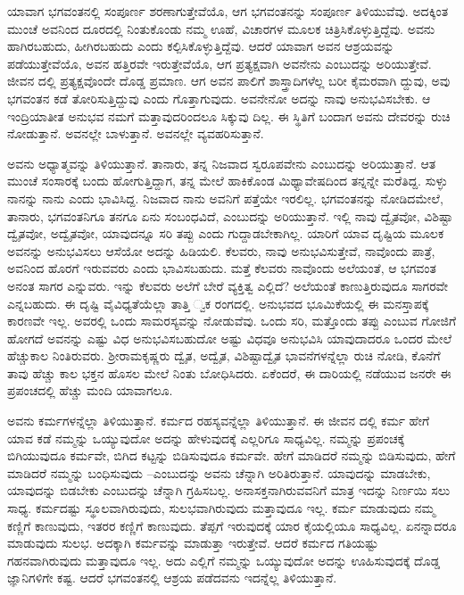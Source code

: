 ಯಾವಾಗ ಭಗವಂತನಲ್ಲಿ ಸಂಪೂರ್ಣ ಶರಣಾಗುತ್ತೇವೆಯೊ, ಆಗ ಭಗವಂತನನ್ನು ಸಂಪೂರ್ಣ ತಿಳಿಯುವೆವು. ಅದಕ್ಕಿಂತ ಮುಂಚೆ ಅವನಿಂದ ದೂರದಲ್ಲಿ ನಿಂತುಕೊಂಡು ನಮ್ಮ ಊಹೆ, ವಿಚಾರಗಳ ಮೂಲಕ ಚಿತ್ರಿಸಿಕೊಳ್ಳುತ್ತಿದ್ದೆವು. ಅವನು ಹಾಗಿರಬಹುದು, ಹೀಗಿರಬಹುದು ಎಂದು ಕಲ್ಪಿಸಿಕೊಳ್ಳುತ್ತಿದ್ದೆವು. ಆದರೆ ಯಾವಾಗ ಅವನ ಆಶ್ರಯವನ್ನು ಪಡೆಯುತ್ತೇವೆಯೊ, ಅವನ ಹತ್ತಿರವೇ ಇರುತ್ತೇವೆಯೊ, ಆಗ ಪ್ರತ್ಯಕ್ಷವಾಗಿ ಅವನೇನು ಎಂಬುದನ್ನು ಅರಿಯುತ್ತೇವೆ. ಜೀವನ ದಲ್ಲಿ ಪ್ರತ್ಯಕ್ಷವೊಂದೇ ದೊಡ್ಡ ಪ್ರಮಾಣ. ಆಗ ಅವನ ಪಾಲಿಗೆ ಶಾಸ್ತ್ರಾದಿಗಳೆಲ್ಲ ಬರೀ ಕೈಮರವಾಗಿ ದ್ದುವು, ಅವು ಭಗವಂತನ ಕಡೆ ತೋರಿಸುತ್ತಿದ್ದುವು ಎಂದು ಗೊತ್ತಾಗುವುದು. ಅವನೇನೋ ಅದನ್ನು ನಾವು ಅನುಭವಿಸಬೇಕು. ಆ ಇಂದ್ರಿಯಾತೀತ ಅನುಭವ ನಮಗೆ ಮತ್ತಾವುದರಿಂದಲೂ ಸಿಕ್ಕುವು ದಿಲ್ಲ. ಈ ಸ್ಥಿತಿಗೆ ಬಂದಾಗ ಅವನು ದೇವರನ್ನು ರುಚಿ ನೋಡುತ್ತಾನೆ. ಅವನಲ್ಲೇ ಬಾಳುತ್ತಾನೆ. ಅವನಲ್ಲೇ ವ್ಯವಹರಿಸುತ್ತಾನೆ.

ಅವನು ಅಧ್ಯಾತ್ಮವನ್ನು ತಿಳಿಯುತ್ತಾನೆ. ತಾನಾರು, ತನ್ನ ನಿಜವಾದ ಸ್ವರೂಪವೇನು ಎಂಬುದನ್ನು ಅರಿಯುತ್ತಾನೆ. ಆತ ಮುಂಚೆ ಸಂಸಾರಕ್ಕೆ ಬಂದು ಹೋಗುತ್ತಿದ್ದಾಗ, ತನ್ನ ಮೇಲೆ ಹಾಕಿಕೊಂಡ ಮಿಥ್ಯಾವೇಷದಿಂದ ತನ್ನನ್ನೇ ಮರೆತಿದ್ದ. ಸುಳ್ಳು ನಾನನ್ನು ನಾನು ಎಂದು ಭಾವಿಸಿದ್ದ. ನಿಜವಾದ ನಾನು ಅವನಿಗೆ ಪತ್ತೆಯೇ ಇರಲಿಲ್ಲ. ಭಗವಂತನನ್ನು ನೋಡಿದಮೇಲೆ, ತಾನಾರು, ಭಗವಂತನಿಗೂ ತನಗೂ ಏನು ಸಂಬಂಧವಿದೆ, ಎಂಬುದನ್ನು ಅರಿಯುತ್ತಾನೆ. ಇಲ್ಲಿ ನಾವು ದ್ವೈತವೋ, ವಿಶಿಷ್ಟಾ ದ್ವೈತವೋ, ಅದ್ವೈತವೋ, ಯಾವುದನ್ನೂ ಸರಿ ತಪ್ಪು ಎಂದು ಗುದ್ದಾಡಬೇಕಾಗಿಲ್ಲ. ಯಾರಿಗೆ ಯಾವ ದೃಷ್ಟಿಯ ಮೂಲಕ ಅವನನ್ನು ಅನುಭವಿಸಲು ಆಸೆಯೋ ಅದನ್ನು ಹಿಡಿಯಲಿ. ಕೆಲವರು, ನಾವು ಅನುಭವಿಸುತ್ತೇವೆ, ನಾವೊಂದು ಪಾತ್ರೆ, ಅವನಿಂದ ಹೊರಗೆ ಇರುವವರು ಎಂದು ಭಾವಿಸಬಹುದು. ಮತ್ತೆ ಕೆಲವರು ನಾವೊಂದು ಅಲೆಯಂತೆ, ಆ ಭಗವಂತ ಅನಂತ ಸಾಗರ ಎನ್ನುವರು. ಇನ್ನು ಕೆಲವರು ಅಲೆಗೆ ಬೇರೆ ವ್ಯಕ್ತಿತ್ವ ಎಲ್ಲಿದೆ? ಅಲೆಯಂತೆ ಕಾಣುತ್ತಿರುವುದೂ ಸಾಗರವೇ ಎನ್ನಬಹುದು. ಈ ದೃಷ್ಟಿ ವೈವಿಧ್ಯತೆಯೆಲ್ಲಾ ತಾತ್ತಿ ್ವಕ ರಂಗದಲ್ಲಿ. ಅನುಭವದ ಭೂಮಿಕೆಯಲ್ಲಿ ಈ ಮನಸ್ತಾಪಕ್ಕೆ ಕಾರಣವೇ ಇಲ್ಲ. ಅವರಲ್ಲಿ ಒಂದು ಸಾಮರಸ್ಯವನ್ನು ನೋಡುವೆವು. ಒಂದು ಸರಿ, ಮತ್ತೊಂದು ತಪ್ಪು ಎಂಬುವ ಗೋಜಿಗೆ ಹೋಗದೆ ಅವನನ್ನು ಎಷ್ಟು ವಿಧ ಅನುಭವಿಸಬಹುದೋ ಅಷ್ಟು ವಿಧವೂ ಅನುಭವಿಸಿ ಯಾವುದಾದರೂ ಒಂದರ ಮೇಲೆ ಹೆಚ್ಚುಕಾಲ ನಿಂತಿರುವರು. ಶ‍್ರೀರಾಮಕೃಷ್ಣರು ದ್ವೈತ, ಅದ್ವೈತ, ವಿಶಿಷ್ಟಾದ್ವೈತ ಭಾವನೆಗಳನ್ನೆಲ್ಲಾ ರುಚಿ ನೋಡಿ, ಕೊನೆಗೆ ತಾವು ಹೆಚ್ಚು ಕಾಲ ಭಕ್ತನ ಹೊಸಲ ಮೇಲೆ ನಿಂತು ಬೋಧಿಸಿದರು. ಏಕೆಂದರೆ, ಈ ದಾರಿಯಲ್ಲಿ ನಡೆಯುವ ಜನರೇ ಈ ಪ್ರಪಂಚದಲ್ಲಿ ಹೆಚ್ಚು ಮಂದಿ ಯಾವಾಗಲೂ.

ಅವನು ಕರ್ಮಗಳನ್ನೆಲ್ಲಾ ತಿಳಿಯುತ್ತಾನೆ. ಕರ್ಮದ ರಹಸ್ಯವನ್ನೆಲ್ಲಾ ತಿಳಿಯುತ್ತಾನೆ. ಈ ಜೀವನ ದಲ್ಲಿ ಕರ್ಮ ಹೇಗೆ ಯಾವ ಕಡೆ ನಮ್ಮನ್ನು ಒಯ್ಯುವುದೋ ಅದನ್ನು ಹೇಳುವುದಕ್ಕೆ ಎಲ್ಲರಿಗೂ ಸಾಧ್ಯವಿಲ್ಲ. ನಮ್ಮನ್ನು ಪ್ರಪಂಚಕ್ಕೆ ಬಿಗಿಯುವುದೂ ಕರ್ಮವೇ, ಬಿಗಿದ ಕಟ್ಟನ್ನು ಬಿಡಿಸುವುದೂ ಕರ್ಮವೇ. ಹೇಗೆ ಮಾಡಿದರೆ ನಮ್ಮನ್ನು ಬಿಡಿಸುವುದು, ಹೇಗೆ ಮಾಡಿದರೆ ನಮ್ಮನ್ನು ಬಂಧಿಸುವುದು –ಎಂಬುದನ್ನು ಅವನು ಚೆನ್ನಾಗಿ ಅರಿತಿರುತ್ತಾನೆ. ಯಾವುದನ್ನು ಮಾಡಬೇಕು, ಯಾವುದನ್ನು ಬಿಡಬೇಕು ಎಂಬುದನ್ನು ಚೆನ್ನಾಗಿ ಗ್ರಹಿಸಬಲ್ಲ. ಅನಾಸಕ್ತನಾಗಿರುವವನಿಗೆ ಮಾತ್ರ ಇದನ್ನು ನಿರ್ಣಯಿ ಸಲು ಸಾಧ್ಯ. ಕರ್ಮದಷ್ಟು ಸ್ಥೂಲವಾಗಿರುವುದು, ಸುಲಭವಾಗಿರುವುದು ಮತ್ತಾವುದೂ ಇಲ್ಲ. ಕರ್ಮ ಮಾಡುವುದು ನಮ್ಮ ಕಣ್ಣಿಗೆ ಕಾಣುವುದು, ಇತರರ ಕಣ್ಣಿಗೆ ಕಾಣುವುದು. ತೆಪ್ಪಗೆ ಇರುವುದಕ್ಕೆ ಯಾರ ಕೈಯಲ್ಲಿಯೂ ಸಾಧ್ಯವಿಲ್ಲ. ಏನನ್ನಾದರೂ ಮಾಡುವುದು ಸುಲಭ. ಅದಕ್ಕಾಗಿ ಕರ್ಮವನ್ನು ಮಾಡುತ್ತಾ ಇರುತ್ತೇವೆ. ಆದರೆ ಕರ್ಮದ ಗತಿಯಷ್ಟು ಗಹನವಾಗಿರುವುದು ಮತ್ತಾವುದೂ ಇಲ್ಲ. ಅದು ಎಲ್ಲಿಗೆ ನಮ್ಮನ್ನು ಒಯ್ಯುವುದೋ ಅದನ್ನು ಊಹಿಸುವುದಕ್ಕೆ ದೊಡ್ಡ ಜ್ಞಾನಿಗಳಿಗೇ ಕಷ್ಟ. ಆದರೆ ಭಗವಂತನಲ್ಲಿ ಆಶ್ರಯ ಪಡೆದವನು ಇದನ್ನೆಲ್ಲ ತಿಳಿಯುತ್ತಾನೆ.

